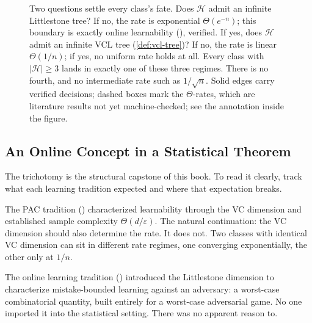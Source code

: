\begin{figure}[ht]
\caption[The universal-rate trichotomy: two tree-conditions, three regimes]{Two questions settle every
class's fate. Does $\mathcal{H}$ admit an infinite Littlestone tree? If no, the rate is exponential
$\Theta(e^{-n})$; this boundary is exactly online learnability
(), verified. If yes, does $\mathcal{H}$ admit an infinite VCL
tree (\cref{def:vcl-tree})? If no, the rate is linear $\Theta(1/n)$; if yes, no uniform rate holds
at all. Every class with $|\mathcal{H}|\geq 3$ lands in exactly one of these three regimes. There is
no fourth, and no intermediate rate such as $1/\sqrt{n}$. Solid edges carry verified decisions;
dashed boxes mark the $\Theta$-rates, which are literature results not yet machine-checked; see the
annotation inside the figure.}
\label{fig:trichotomy-tree}
\end{figure}

\subsection{An Online Concept in a Statistical Theorem}
\label{sec:surprise}

The trichotomy is the structural capstone of this book.  To read it clearly,
track what each learning tradition expected and where that expectation breaks.

The PAC tradition () characterized learnability through the VC
dimension and established sample complexity $\Theta(d/\varepsilon)$.  The
natural continuation: the VC dimension should also determine the rate.
It does not.  Two classes with identical VC dimension can sit in different
rate regimes, one converging exponentially, the other only at $1/n$.

The online learning tradition () introduced the Littlestone
dimension to characterize mistake-bounded learning against an adversary: a
worst-case combinatorial quantity, built entirely for a worst-case adversarial
game.  No one imported it into the statistical setting.  There was no apparent
reason to.

